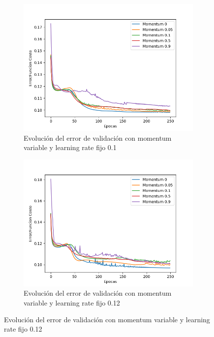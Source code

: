 \begin{figure}[!htbp]
\centering
\begin{subfigure}{.5\textwidth}
  \centering
  \includegraphics[width=1\linewidth]{graficos/ej2/eta_x_momentum_promedios_validacion_0_1.png}
  \caption{Evolución del error de validación con momentum variable y learning rate fijo 0.1}
  \label{fig:sub1}
\end{subfigure}%
\begin{subfigure}{.5\textwidth}
  \centering
  \includegraphics[width=1\linewidth]{graficos/ej2/eta_x_momentum_promedios_validacion_0_12.png}
  \caption{Evolución del error de validación con momentum variable y learning rate fijo 0.12}
  \label{fig:sub2}
\end{subfigure}
\end{figure}

